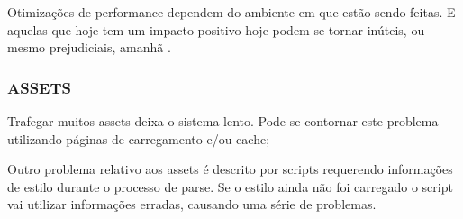 \begin{draft}
Otimizações de performance dependem do ambiente em que estão
sendo feitas. E aquelas que hoje tem um impacto positivo hoje
podem se tornar inúteis, ou mesmo prejudiciais, amanhã
\autocite[pp.131]{html5mostwanted}.

\subsubsection{ASSETS}

Trafegar muitos assets deixa o sistema lento. Pode-se contornar este
problema utilizando páginas de carregamento e/ou cache;

Outro problema relativo aos assets é descrito por \cite{howBrowsersWork}
scripts requerendo informações de estilo durante o processo de
parse. Se o estilo ainda não foi carregado o script vai utilizar
informações erradas, causando uma série de problemas.

\end{draft}
